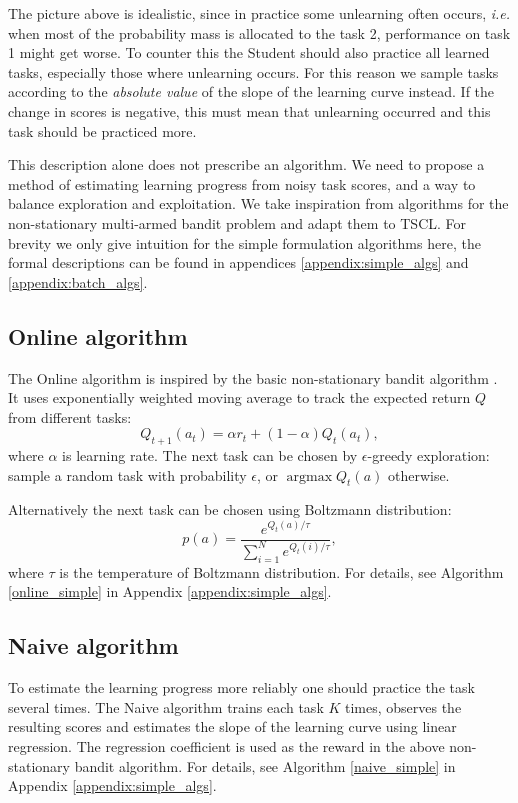\documentclass{article}
\DeclareMathOperator{\argmax}{argmax}
\begin{document}
The picture above is idealistic, since in practice some  unlearning often occurs, \textit{i.e.} when most of the probability mass is allocated to the task 2, performance on task 1 might get worse. To counter this the Student should also practice all learned tasks, especially those where unlearning occurs. For this reason we sample tasks according to the \textit{absolute value} of the slope of the learning curve instead. If the change in scores is negative, this must mean that unlearning occurred and this task should be practiced more.

This description alone does not prescribe an algorithm. We need to propose a method of estimating learning progress from noisy task scores, and a way to balance exploration and exploitation. We take inspiration from algorithms for the non-stationary multi-armed bandit problem \citep{Sutton1998} and adapt them to TSCL. For brevity we only give intuition for the simple formulation algorithms here, the formal descriptions can be found in appendices \ref{appendix:simple_algs} and \ref{appendix:batch_algs}.

\subsection{Online algorithm}

The Online algorithm is inspired by the basic non-stationary bandit algorithm
\citep{Sutton1998}. It uses exponentially weighted moving average to track the expected return $Q$ from different tasks:
\[
Q_{t+1}(a_t)=\alpha r_t+(1- \alpha)Q_t(a_t),
\]
where $\alpha$ is learning rate. The next task can be chosen by $\epsilon$-greedy exploration: sample a random task with probability $\epsilon$, or $\argmax Q_t(a)$ otherwise.


Alternatively the next task can be chosen using Boltzmann distribution:
\[
p(a)=\frac{e^{Q_t(a)/\tau}}{\sum^N_{i=1}e^{Q_t(i)/\tau}},
\]
where $\tau$ is the temperature of Boltzmann distribution. For details, see Algorithm \ref{online_simple} in Appendix \ref{appendix:simple_algs}.

\subsection{Naive algorithm}

To estimate the learning progress more reliably one should practice the task several times. The Naive algorithm trains each task $K$ times, observes the resulting scores and estimates the slope of the learning curve using linear regression. The regression coefficient is used as the reward in the above non-stationary bandit algorithm. For details, see Algorithm \ref{naive_simple} in Appendix \ref{appendix:simple_algs}.
\end{document}

